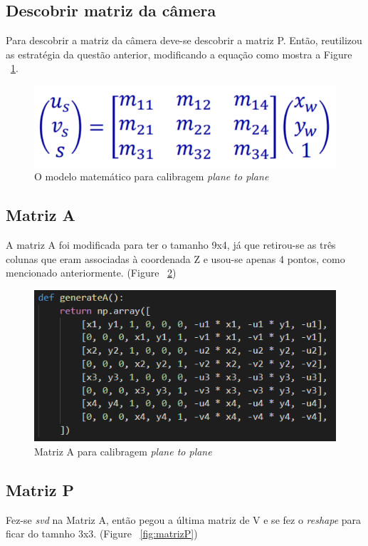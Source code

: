 \documentclass{article}
\begin{document}
    \subsection{Descobrir matriz da câmera}
    Para descobrir a matriz da câmera deve-se descobrir a matriz P. Então, reutilizou as estratégia da questão anterior, modificando a equação como mostra a Figure ~\ref{fig:planeToPlane}.
    \begin{figure}[h!]
    \includegraphics[scale=0.6]{planeToPlane.PNG}
    \caption{O modelo matemático para calibragem \textit{plane to plane}}
    \label{fig:planeToPlane}
    \end{figure}
        
        \subsection{Matriz A}
        A matriz A foi modificada para ter o tamanho 9x4, já que retirou-se as três colunas que eram associadas à coordenada Z e usou-se apenas 4 pontos, como mencionado anteriormente. (Figure ~\ref{fig:matrizA})
        
        \begin{figure}[h!]
        \includegraphics[scale=1]{matrizA.PNG}
        \caption{Matriz A para calibragem \textit{plane to plane}}
        \label{fig:matrizA}
        \end{figure}
        
        \subsection{Matriz P}
        Fez-se \textit{svd} na Matriz A, então pegou a última matriz de V e se fez o \textit{reshape} para ficar do tamnho 3x3. (Figure ~\ref{fig:matrizP})
        
\end{document}
